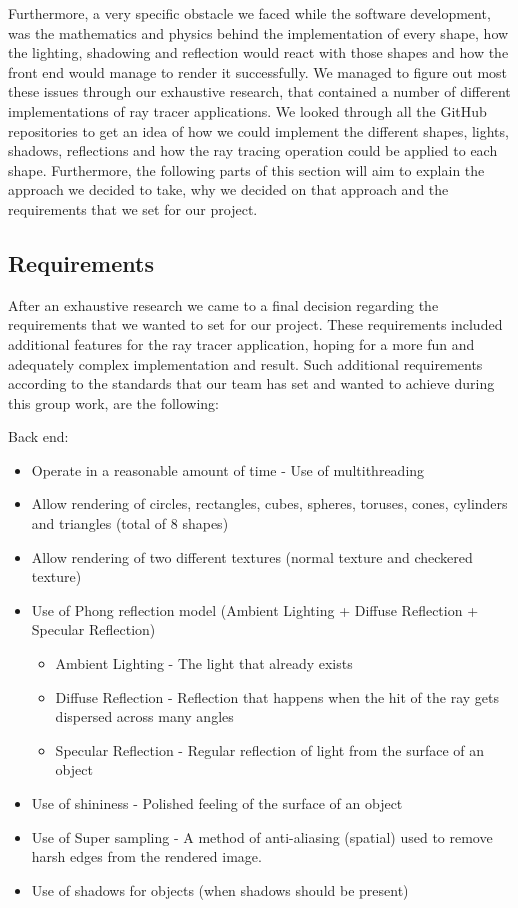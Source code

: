 \documentclass[11pt,a4paper]{article}
\begin{document}
Furthermore, a very specific obstacle we faced while the software development, was the mathematics and physics behind the implementation of every shape, how the lighting, shadowing and reflection would react with those shapes and how the front end would manage to render it successfully. We managed to figure out most these issues through our exhaustive research, that contained a number of different implementations of ray tracer applications. We looked through all the GitHub repositories to get an idea of how we could implement the different shapes, lights, shadows, reflections and how the ray tracing operation could be applied to each shape.
Furthermore, the following parts of this section will aim to explain the approach we decided to take, why we decided on that approach and the requirements that we set for our project.

\subsection{Requirements}
After an exhaustive research we came to a final decision regarding the requirements that we wanted to set for our project. These requirements included additional features for the ray tracer application, hoping for a more fun and adequately complex implementation and result. Such additional requirements according to the standards that our team has set and wanted to achieve during this group work, are the following: 

Back end:
\begin{itemize}[nosep, wide=20pt, leftmargin=*, after=\strut]
    \item Operate in a reasonable amount of time - Use of multithreading 
    \item Allow rendering of circles, rectangles, cubes, spheres, toruses, cones, cylinders and triangles (total of 8 shapes)
    \item Allow rendering of two different textures (normal texture and checkered texture) 
    \item Use of Phong reflection model (Ambient Lighting + Diffuse Reflection + Specular Reflection) 
    
    \begin{itemize}[nosep, wide=20pt, leftmargin=*, after=\strut]
        \item Ambient Lighting - The light that already exists 
        \item Diffuse Reflection - Reflection that happens when the hit of the ray gets dispersed across many angles
        \item Specular Reflection - Regular reflection of light from the surface of an object
    \end{itemize}
    
    \item Use of shininess -  Polished feeling of the surface of an object 
    \item Use of Super sampling - A method of anti-aliasing (spatial) used to remove harsh edges from the rendered image. 
    \item Use of shadows for objects (when shadows should be present) 
\end{itemize}
\end{document}
